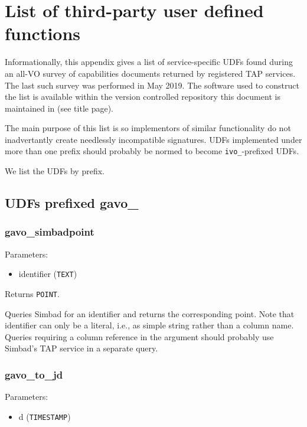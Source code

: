 \documentclass[11pt,a4paper]{ivoa}
\begin{document}
\appendix

\section{List of third-party user defined functions}

Informationally, this appendix gives a list of service-specific UDFs
found during an all-VO survey of capabilities documents returned by
registered TAP services.  The last such survey was performed in May
2019.  The software used to construct the list is available within the
version controlled repository this document is maintained in (see title
page).

The main purpose of this list is so implementors of similar
functionality do not inadvertantly create needlessly incompatible
signatures.  UDFs implemented under more than one prefix should probably
be normed to become \verb|ivo_|-prefixed UDFs.

We list the UDFs by prefix.

\subsection{UDFs prefixed gavo\_}

\subsubsection{gavo\_simbadpoint}

Parameters:

\begin{itemize}
	\item identifier (\texttt{TEXT})
\end{itemize}

Returns \texttt{POINT}.

Queries Simbad for an identifier and returns the corresponding point.
Note that identifier can only be a literal, i.e., as simple string
rather than a column name.  Queries requiring a column reference in the
argument should probably use Simbad's TAP service in a separate query.

\subsubsection{gavo\_to\_jd}

Parameters:

\begin{itemize}
	\item d (\texttt{TIMESTAMP})
\end{itemize}
\end{document}
